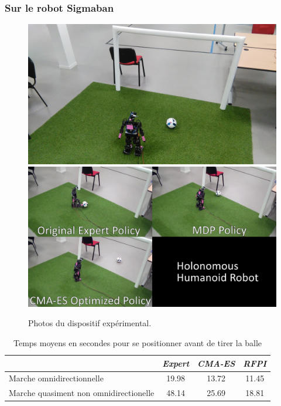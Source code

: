 \subsubsection{Sur le robot Sigmaban}

\begin{figure}[htb]
    \centerfloat
    \includegraphics[width=1.0\linewidth]{../media/odometry_cmaes_setup.jpg}
    \includegraphics[width=1.0\linewidth]{../media/odometry_cmaes_setup2.jpg}
    \caption{\label{fig:odometry_cmaes_setup} 
        Photos du dispositif expérimental.
    }
\end{figure}

\begin{table}[htb]
    \caption{\label{tab:odometry_cmaes_results_real}Temps moyens en secondes pour se positionner 
        avant de tirer la balle}
    \centering
    \begin{tabular}{|l|c|c|c|}
        \hline
            & \textit{Expert} & \textit{CMA-ES} & \textit{RFPI} \\
        \hline
        Marche omnidirectionnelle   & 19.98      & 13.72  & 11.45      \\
        Marche quasiment non omnidirectionelle & 48.14      & 25.69  & 18.81 \\
        \hline
    \end{tabular}
\end{table}

